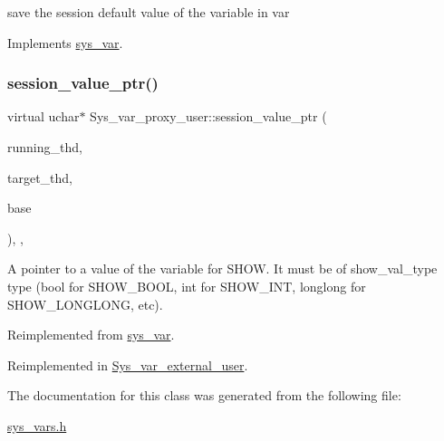 save the session default value of the variable in var 

Implements \mbox{\hyperlink{classsys__var}{sys\+\_\+var}}.

\mbox{\label{classSys__var__proxy__user_adb78f56144c8f7fd06d74c41777657d5}} 
\subsubsection{\texorpdfstring{session\+\_\+value\+\_\+ptr()}{session\_value\_ptr()}}
{\footnotesize\ttfamily virtual uchar$\ast$ Sys\+\_\+var\+\_\+proxy\+\_\+user\+::session\+\_\+value\+\_\+ptr (\begin{DoxyParamCaption}\item[{T\+HD $\ast$}]{running\+\_\+thd,  }\item[{T\+HD $\ast$}]{target\+\_\+thd,  }\item[{L\+E\+X\+\_\+\+S\+T\+R\+I\+NG $\ast$}]{base }\end{DoxyParamCaption})\hspace{0.3cm}{\ttfamily [inline]}, {\ttfamily [protected]}, {\ttfamily [virtual]}}

A pointer to a value of the variable for S\+H\+OW. It must be of show\+\_\+val\+\_\+type type (bool for S\+H\+O\+W\+\_\+\+B\+O\+OL, int for S\+H\+O\+W\+\_\+\+I\+NT, longlong for S\+H\+O\+W\+\_\+\+L\+O\+N\+G\+L\+O\+NG, etc). 

Reimplemented from \mbox{\hyperlink{classsys__var_a3e511591aaf555d2bc2ce40a80b7e899}{sys\+\_\+var}}.



Reimplemented in \mbox{\hyperlink{classSys__var__external__user_ac6b27bbbb43cea6353281663397f9b8c}{Sys\+\_\+var\+\_\+external\+\_\+user}}.



The documentation for this class was generated from the following file\+:\begin{DoxyCompactItemize}
\item 
\mbox{\hyperlink{sys__vars_8h}{sys\+\_\+vars.\+h}}\end{DoxyCompactItemize}
